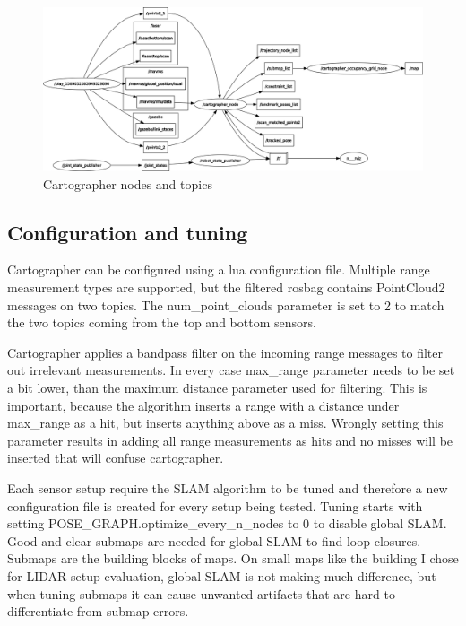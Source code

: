 \begin{figure}[!ht]
    \centering
    \includegraphics[width=140mm, keepaspectratio]{figures/cartographer_nodes.png}
    \caption{Cartographer nodes and topics}
    \label{fig:cartographer_nodes}
\end{figure}

\subsection{Configuration and tuning}
Cartographer can be configured using a lua configuration file. Multiple range measurement types are 
supported, but the filtered rosbag contains PointCloud2 messages on two topics. The num\_point\_clouds 
parameter is set to 2 to match the two topics coming from the top and bottom sensors. 

Cartographer applies a bandpass filter on the incoming range messages to filter out irrelevant 
measurements. In every case max\_range parameter needs to be set a bit lower, than the maximum distance
parameter used for filtering. This is important, because the algorithm inserts a range with a distance 
under max\_range as a hit, but inserts anything above as a miss. Wrongly setting this parameter results
in adding all range measurements as hits and no misses will be inserted that will confuse cartographer.

Each sensor setup require the SLAM algorithm to be tuned and therefore a new configuration file is 
created for every setup being tested. Tuning starts with setting POSE\_GRAPH.optimize\_every\_n\_nodes to
0 to disable global SLAM. Good and clear submaps are needed for global SLAM to find loop closures.
Submaps are the building blocks of maps. On small maps like the building I chose for LIDAR setup 
evaluation, global SLAM is not making much difference, but when tuning submaps it can cause unwanted
artifacts that are hard to differentiate from submap errors.

